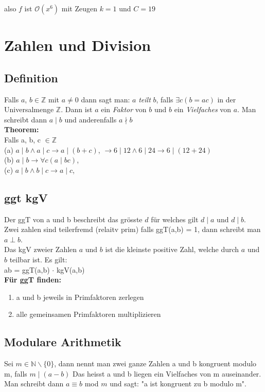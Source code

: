 \documentclass[12pt]{scrartcl}
\begin{document}
also $f$ ist $\mathcal{O}(x^6)$ mit Zeugen $k=1$ und $C = 19$


\newpage
\section{Zahlen und Division}
\subsection{Definition}
Falls $a$, $b \in \mathbb{Z}$ mit $a \neq 0$ dann sagt man: $a$ \textit{teilt} $b$, falls $\exists c (b = ac)$
in der Universalmenge $\mathbb{Z}$. Dann ist $a$ ein \textit{Faktor} von $b$ und $b$ ein \textit{Vielfaches}
von $a$. Man schreibt dann $a \mid b$ und anderenfalls $a \nmid b$\\

\textbf{Theorem:}\\
Falls a, b, c $\in \mathbb{Z}$\\
(a) $a \mid  b  \land a \mid c \rightarrow a \mid (b + c)$, $\rightarrow 6 \mid 12 \land 6 \mid 24 \rightarrow 6 \mid (12+24)$ \\  
(b) $a \mid b  \rightarrow \forall c(a \mid bc) $,\\  
(c) $a \mid b  \land b \mid c \rightarrow a \mid c$,\\  


\subsection{ggt kgV}
Der ggT von a und b beschreibt das grösste $d$ für welches gilt $d \mid a$ und $d \mid b$.\\
Zwei zahlen sind teilerfremd (relaitv prim) falls ggT(a,b) = 1, dann schreibt man
$a \perp b$. \\

Das kgV zweier Zahlen $a$ und $b$ ist die kleinste positive Zahl, welche durch
$a$ und $b$ teilbar ist. Es gilt:\\

ab = ggT(a,b) $\cdot$ kgV(a,b)\\

\textbf{Für ggT finden:}
\begin{enumerate}
    \item a und b jeweils in Primfaktoren zerlegen
    \item alle gemeinsamen Primfaktoren multiplizieren
\end{enumerate}


\subsection{Modulare Arithmetik}
Sei $m \in \mathbb{N} \backslash \{0\}$, dann nennt man zwei ganze Zahlen a und b kongruent modulo m, falls $m\mid (a - b)$
Das heisst a und b liegen ein Vielfaches von m auseinander. Man schreibt dann $a \equiv b$ mod $m$ und sagt:
"a ist kongruent zu b modulo m".\\
\end{document}
